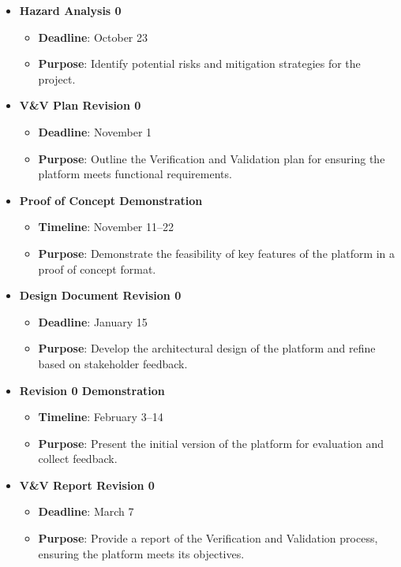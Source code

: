 \documentclass[12pt]{article}
\begin{document}
\begin{itemize}
    \item \textbf{Hazard Analysis 0}
        \begin{itemize}
            \item \textbf{Deadline}: October 23
            \item \textbf{Purpose}: Identify potential risks and mitigation strategies for the project.
        \end{itemize}
    \item \textbf{V\&V Plan Revision 0}
        \begin{itemize}
            \item \textbf{Deadline}: November 1
            \item \textbf{Purpose}: Outline the Verification and Validation plan for ensuring the platform meets functional requirements.
        \end{itemize}
    \item \textbf{Proof of Concept Demonstration}
        \begin{itemize}
            \item \textbf{Timeline}: November 11–22
            \item \textbf{Purpose}: Demonstrate the feasibility of key features of the platform in a proof of concept format.
        \end{itemize}
    \item \textbf{Design Document Revision 0}
        \begin{itemize}
            \item \textbf{Deadline}: January 15
            \item \textbf{Purpose}: Develop the architectural design of the platform and refine based on stakeholder feedback.
        \end{itemize}
    \item \textbf{Revision 0 Demonstration}
        \begin{itemize}
            \item \textbf{Timeline}: February 3–14
            \item \textbf{Purpose}: Present the initial version of the platform for evaluation and collect feedback.
        \end{itemize}
    \item \textbf{V\&V Report Revision 0}
        \begin{itemize}
            \item \textbf{Deadline}: March 7
            \item \textbf{Purpose}: Provide a report of the Verification and Validation process, ensuring the platform meets its objectives.

\end{itemize}
\end{itemize}
\end{document}
